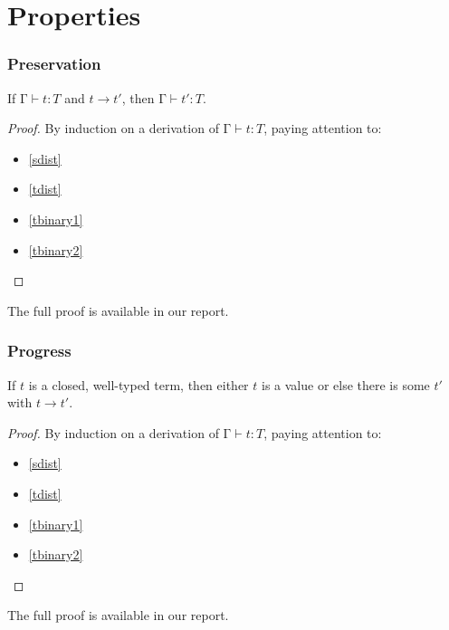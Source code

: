 \documentclass{beamer}
\begin{document}
\section{Properties}
\begin{frame}
    \frametitle{Preservation}

    \begin{theorem}[Preservation]
      \upshape
      If $\texttt{Γ}\vdash t : T$ and $t\longrightarrow t'$, then $\texttt{Γ}\vdash t' : T$.
    \end{theorem}
    \begin{proof}
      By induction on a derivation of $\texttt{Γ}\vdash t : T$, paying attention to:
      \begin{itemize}
        \item \ref{sdist}
        \item \ref{tdist}
        \item \ref{tbinary1}
        \item \ref{tbinary2}
      \end{itemize}
    \end{proof}

    The full proof is available in our report.
\end{frame}
\begin{frame}
    \frametitle{Progress}

    \begin{theorem}[Progress]
      \upshape
      If $t$ is a closed, well-typed term, then either $t$ is a
      value or else there is some $t'$ with $t\longrightarrow t'$.
    \end{theorem}
    \begin{proof}
      By induction on a derivation of $\texttt{Γ}\vdash t : T$, paying attention to:
      \begin{itemize}
        \item \ref{sdist}
        \item \ref{tdist}
        \item \ref{tbinary1}
        \item \ref{tbinary2}
      \end{itemize}
    \end{proof}

    The full proof is available in our report.

\end{frame}
\end{document}
